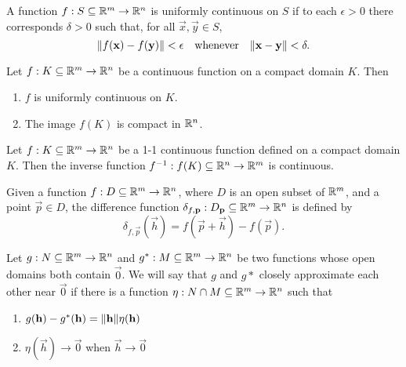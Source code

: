 \documentclass{article}
\begin{document}
\begin{theorem}
    A function ${f: S \subseteq \mathbb{R}^m \rightarrow \mathbb{R}^n}$ is uniformly continuous
    on $S$ if to each $\epsilon > 0$ there corresponds $\delta > 0$ such that, for all
    $\vec{x}, \vec{y} \in S$,
    \begin{equation*}
        \lVert f(\mathbf{x}) - f(\mathbf{y})\rVert < \epsilon \quad \textnormal{whenever} \quad \lVert\mathbf{x} - \mathbf{y}\rVert < \delta.
    \end{equation*}
\end{theorem}

\begin{theorem}
    Let $f: K \subseteq \mathbb{R}^m \rightarrow \mathbb{R}^n$ be a continuous function
    on a compact domain $K$. Then
    \begin{enumerate}
        \item $f$ is uniformly continuous on $K$.
        \item The image $f(K)$ is compact in $\mathbb{R}^n$.
    \end{enumerate}
\end{theorem}

\begin{theorem}
    Let $f: K \subseteq \mathbb{R}^m \rightarrow \mathbb{R}^n$ be a 1-1 continuous
    function defined on a compact domain $K$. Then the inverse function
    $f^{-1}: f(K) \subseteq \mathbb{R}^n \rightarrow \mathbb{R}^m$ is continuous.
\end{theorem}

\begin{definition}
    Given a function $f: D \subseteq \mathbb{R}^m \rightarrow \mathbb{R}^n$,
    where $D$ is an open subset of $\mathbb{R}^m$, and a point $\vec{p} \in D$,
    the difference function $\delta_{f, \mathbf{p}} : D_{\mathbf{p}} \subseteq \mathbb{R}^m \rightarrow \mathbb{R}^n$
    is defined by
    \begin{equation*}
        \delta_{f, \vec{p}}(\vec{h}) = f(\vec{p} + \vec{h}) - f(\vec{p}).
    \end{equation*}
\end{definition}

\begin{definition}
    Let $g: N \subseteq \mathbb{R}^m \rightarrow \mathbb{R}^n$ and $g^*: M \subseteq \mathbb{R}^m \rightarrow \mathbb{R}^n$ be
    two functions whose open domains both contain $\vec{0}$. We will say that $g$ and $g*$
    closely approximate each other near $\vec{0}$ if there is a function
    $\eta: N \cap M \subseteq \mathbb{R}^m \rightarrow \mathbb{R}^n$ such that
    \begin{enumerate}
        \item $g(\mathbf{h}) - g^*(\mathbf{h}) = \lVert\mathbf{h}\rVert\eta(\mathbf{h})$
        \item $\eta(\vec{h}) \rightarrow \vec{0}$ when $\vec{h} \rightarrow \vec{0}$
    \end{enumerate}
\end{definition}
\end{document}
